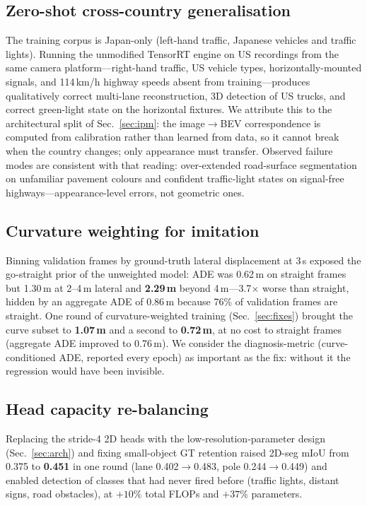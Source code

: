 \documentclass[10pt,twocolumn]{article}
\begin{document}
\subsection{Zero-shot cross-country generalisation}
The training corpus is Japan-only (left-hand traffic, Japanese vehicles and
traffic lights). Running the unmodified TensorRT engine on US recordings
from the same camera platform---right-hand traffic, US vehicle types,
horizontally-mounted signals, and 114\,km/h highway speeds absent from
training---produces qualitatively correct multi-lane reconstruction, 3D
detection of US trucks, and correct green-light state on the horizontal
fixtures. We attribute this to the architectural split of
Sec.~\ref{sec:ipm}: the image$\to$BEV correspondence is computed from
calibration rather than learned from data, so it cannot break when the
country changes; only appearance must transfer. Observed failure modes are
consistent with that reading: over-extended road-surface segmentation on
unfamiliar pavement colours and confident traffic-light states on
signal-free highways---appearance-level errors, not geometric ones.

\subsection{Curvature weighting for imitation}
\label{sec:exp:curve}
Binning validation frames by ground-truth lateral displacement at 3\,s
exposed the go-straight prior of the unweighted model: ADE was 0.62\,m on
straight frames but 1.30\,m at 2--4\,m lateral and \textbf{2.29\,m} beyond
4\,m---3.7$\times$ worse than straight, hidden by an aggregate ADE of
0.86\,m because 76\% of validation frames are straight. One round of
curvature-weighted training (Sec.~\ref{sec:fixes}) brought the curve subset to
\textbf{1.07\,m} and a second to \textbf{0.72\,m}, at no cost to straight
frames (aggregate ADE improved to 0.76\,m). We consider the diagnosis-metric
(curve-conditioned ADE, reported every epoch) as important as the fix: without
it the regression would have been invisible.

\subsection{Head capacity re-balancing}
\label{sec:exp:capacity}
Replacing the stride-4 2D heads with the low-resolution-parameter design
(Sec.~\ref{sec:arch}) and fixing small-object GT retention raised 2D-seg mIoU
from 0.375 to \textbf{0.451} in one round (lane 0.402$\to$0.483, pole
0.244$\to$0.449) and enabled detection of classes that had never fired before
(traffic lights, distant signs, road obstacles), at $+10\%$ total FLOPs and
$+37\%$ parameters.
\end{document}
